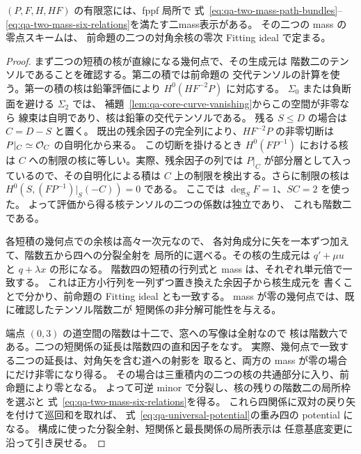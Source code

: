 \begin{corollary}[捩れ付き窓の二mass有限表示]
\label{cor:qa-twisted-avatar-two-mass}
$(P,F,H,HF)$ の有限窓には、fppf 局所で
式~\eqref{eq:qa-two-mass-path-bundles}--%
\eqref{eq:qa-two-mass-six-relations}を満たす二mass表示がある。
その二つの mass の零点スキームは、
前命題の二つの対角余核の零次 Fitting ideal で定まる。
\end{corollary}
\begin{proof}
まず二つの短積の核が直線になる幾何点で、その生成元は
階数二のテンソルであることを確認する。第二の積では前命題の
交代テンソルの計算を使う。第一の積の核は鉛筆評価により
$H^0(HF^{-2}P)$ に対応する。
$\Sigma_0$ または負断面を避ける $\Sigma_2$ では、
補題~\ref{lem:qa-core-curve-vanishing}からこの空間が非零なら
線束は自明であり、核は鉛筆の交代テンソルである。
残る $S\le D$ の場合は $C=D-S$ と置く。
既出の残余因子の完全列により、$HF^{-2}P$ の非零切断は
$P|_C\simeq\mathcal O_C$ の自明化から来る。
この切断を掛けるとき $H^0(FP^{-1})$ における核は
$C$ への制限の核に等しい。実際、残余因子の列では
$P|_C$ が部分層として入っているので、その自明化による積は
$C$ 上の制限を検出する。さらに制限の核は
$H^0(S,(FP^{-1})|_S(-C))=0$ である。
ここでは $\deg_S F=1$、$S C=2$ を使った。
よって評価から得る核テンソルの二つの係数は独立であり、
これも階数二である。

各短積の幾何点での余核は高々一次元なので、
各対角成分に矢を一本ずつ加えて、階数五から四への分裂全射を
局所的に選べる。その核の生成元は
$q'+\mu u$ と $q+\lambda x$ の形になる。
階数四の短積の行列式と mass は、それぞれ単元倍で一致する。
これは正方小行列を一列ずつ置き換えた余因子から核生成元を
書くことで分かり、前命題の Fitting ideal とも一致する。
mass が零の幾何点では、既に確認したテンソル階数二が
短関係の非分解可能性を与える。

端点 $(0,3)$ の道空間の階数は十二で、窓への写像は全射なので
核は階数六である。二つの短関係の延長は階数四の直和因子をなす。
実際、幾何点で一致する二つの延長は、対角矢を含む道への射影を
取ると、両方の mass が零の場合にだけ非零になり得る。
その場合は三重積内の二つの核の共通部分に入り、前命題により零となる。
よって可逆 minor で分裂し、核の残りの階数二の局所枠を選ぶと
式~\eqref{eq:qa-two-mass-six-relations}を得る。
これら四関係に双対の戻り矢を付けて巡回和を取れば、
式~\eqref{eq:qa-universal-potential}の重み四の potential になる。
構成に使った分裂全射、短関係と最長関係の局所表示は
任意基底変更に沿って引き戻せる。
\end{proof}

